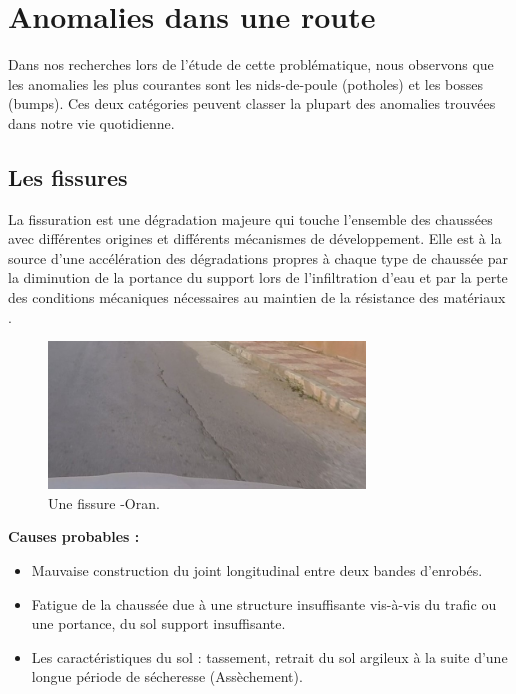 \section{Anomalies dans une route}
Dans nos recherches lors de l'étude de cette problématique, nous observons que les anomalies
les plus courantes sont les nids-de-poule (potholes) et les bosses (bumps).
Ces deux catégories peuvent classer la plupart des anomalies trouvées dans notre vie quotidienne.

\subsection{Les fissures}
La fissuration est une dégradation majeure qui touche l'ensemble des chaussées avec différentes origines et différents mécanismes de développement. Elle est à la source d'une accélération des dégradations propres à chaque type de chaussée par la diminution de la portance du support lors de l'infiltration d'eau et par la perte des conditions mécaniques nécessaires au maintien de la résistance des matériaux \cite{FissurationOrnierageProblematiques}.

\begin{figure}[h!]
  \center
  \includegraphics[width=0.75\textwidth]{Images/chapter1/fissures.jpg}
  \caption{Une fissure -Oran.}
  \label{fig:Technologies}
\end{figure}


\textbf{Causes probables :}
\renewcommand{\labelitemi}{$\bullet$}
\begin{itemize}

  \item Mauvaise construction du joint longitudinal entre deux bandes d'enrobés.
  \item Fatigue de la chaussée due à une structure insuffisante vis-à-vis du trafic
        ou une portance, du sol support insuffisante.
  \item Les caractéristiques du sol : tassement, retrait du sol argileux à la suite
        d'une longue période de sécheresse (Assèchement).
\end{itemize}


